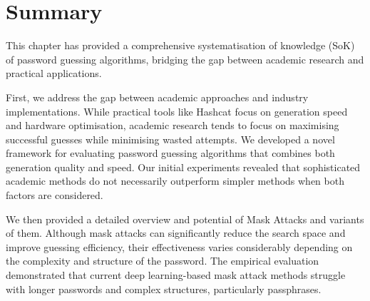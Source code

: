 \section{Summary}
\label{sec::chp5::summary}

This chapter has provided a comprehensive systematisation of knowledge (SoK) of password guessing algorithms, bridging the gap between academic research and practical applications.

First, we address the gap between academic approaches and industry implementations. While practical tools like Hashcat focus on generation speed and hardware optimisation, academic research tends to focus on maximising successful guesses while minimising wasted attempts. We developed a novel framework for evaluating password guessing algorithms that combines both generation quality and speed. Our initial experiments revealed that sophisticated academic methods do not necessarily outperform simpler methods when both factors are considered.

We then provided a detailed overview and potential of Mask Attacks and variants of them. Although mask attacks can significantly reduce the search space and improve guessing efficiency, their effectiveness varies considerably depending on the complexity and structure of the password. The empirical evaluation demonstrated that current deep learning-based mask attack methods struggle with longer passwords and complex structures, particularly passphrases.
